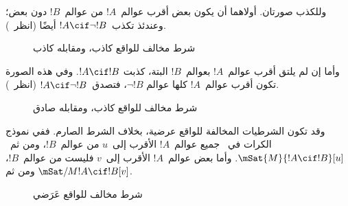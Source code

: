 \documentclass[../../../include/open-logic-section]{subfiles}
\begin{document}
وللكذب صورتان. أولاهما أن يكون بعض أقرب عوالم~$!A$ من عوالم~$!B$
دون بعض؛ وعندئذ تكذب~$!A \cif \lnot !B$ أيضًا
(انظر~).
\begin{figure}
\begin{center}
\caption{شرط مخالف للواقع كاذب، ومقابله كاذب}
\end{center}
\end{figure}
وأما إن لم يلتق أقرب عوالم~$!A$ بعوالم~$!B$ البتة، كذبت
$!A \cif !B$. وفي هذه الصورة تكون أقرب عوالم~$!A$ كلها عوالم
$\lnot !B$، فتصدق~$!A \cif \lnot !B$
(انظر~).
\begin{figure}
\begin{center}
\caption{شرط مخالف للواقع كاذب، ومقابله صادق}
\end{center}
\end{figure}

وقد تكون الشرطيات المخالفة للواقع عرضية، بخلاف الشرط الصارم. ففي نموذج
الكرات في~ جميع عوالم~$!A$ الأقرب إلى~$u$ من
عوالم~$!B$، ومن ثم~$\mSat{M}{!A \cif !B}[u]$. وأما بعض عوالم~$!A$
الأقرب إلى~$v$ فليست من عوالم~$!B$، ومن ثم
$\mSat/{M}{!A \cif !B}[v]$.
\begin{figure}
\begin{center}
\end{center}
\caption{شرط مخالف للواقع عَرَضي}
\end{figure}
\end{document}
